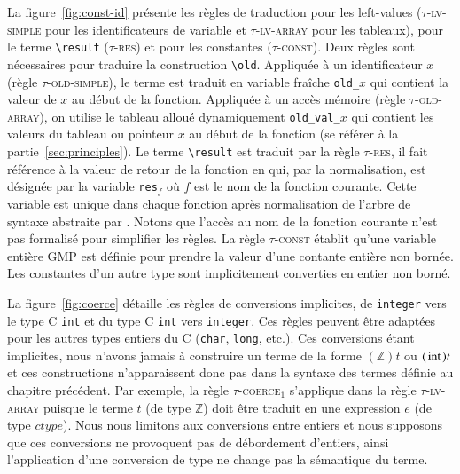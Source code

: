 La figure~\ref{fig:const-id} présente les règles de traduction pour les
left-values (\textsc{$\tau$-lv-simple} pour les identificateurs de variable et
\textsc{$\tau$-lv-array} pour les tableaux), pour le terme
\lstinline'\result' (\textsc{$\tau$-res}) et pour les constantes
(\textsc{$\tau$-const}).
Deux règles sont nécessaires pour traduire la construction \eacsl
\lstinline'\old'.
Appliquée à un identificateur $x$ (règle \textsc{$\tau$-old-simple}), le terme
est traduit en variable fraîche \lstinline'old_'$x$ qui contient la valeur de
$x$ au début de la fonction.
Appliquée à un accès mémoire (règle \textsc{$\tau$-old-array}), on utilise le
tableau alloué dynamiquement \lstinline'old_val_'$x$ qui contient les valeurs du
tableau ou pointeur $x$ au début de la fonction (se référer à la
partie~\ref{sec:principles}).
Le terme \lstinline'\result' est traduit par la règle \textsc{$\tau$-res}, il
fait référence à la valeur de retour de la fonction en \eacsl qui, par la
normalisation, est désignée par la variable \lstinline[escapechar=§]'res'$_f$ où
$f$ est le nom de la fonction courante.
Cette variable est unique dans chaque fonction après normalisation de l'arbre de
syntaxe abstraite par \framac.
Notons que l'accès au nom de la fonction courante n'est pas formalisé pour
simplifier les règles.
La règle \textsc{$\tau$-const} établit qu'une variable entière GMP est définie
pour prendre la valeur d'une contante entière non bornée.
Les constantes d'un autre type sont implicitement converties en entier non
borné.



La figure~\ref{fig:coerce} détaille les règles de conversions implicites, de
\lstinline'integer' vers le type C \lstinline'int' et du type C \lstinline'int'
vers \lstinline'integer'.
Ces règles peuvent être adaptées pour les autres types entiers du C
(\lstinline'char', \lstinline'long', etc.).
Ces conversions étant implicites, nous n'avons jamais à construire un terme
de la forme $(\mathbb{Z})t$ ou $(\mbox{\lstinline'int'})t$ et ces constructions
n'apparaissent donc pas dans la syntaxe des termes définie au chapitre
précédent.
Par exemple, la règle \textsc{$\tau$-coerce$_1$} s'applique dans la règle
\textsc{$\tau$-lv-array} puisque le terme $t$ (de type $\mathbb{Z}$) doit être
traduit en une expression $e$ (de type $ctype$).
Nous nous limitons aux conversions entre entiers et nous supposons que ces
conversions ne provoquent pas de débordement d'entiers, ainsi l'application
d'une conversion de type ne change pas la sémantique du terme.


